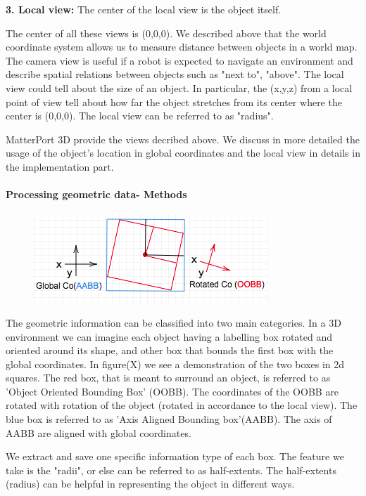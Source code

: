 \textbf{3. Local view:} The center of the local view is the object itself. 

The center of all these views is (0,0,0). We described above that the world coordinate system allows us to measure distance between objects in a world map. The camera view is useful if a robot is expected to navigate an environment and describe spatial relations between objects such as "next to", "above". The local view could tell about the size of an object. In particular, the (x,y,z) from a local point of view tell about how far the object stretches from its center where the center is (0,0,0). The local view can be referred to as "radius". 

MatterPort 3D provide the views decribed above. We discuss in more detailed the usage of the object's location in global coordinates and the local view in details in the implementation part.  

\paragraph{Processing geometric data- Methods}

\begin{figure}[H]
\includegraphics[scale=0.5]{images/A-OB.png}
\label{}
\end{figure}


The geometric information can be classified into two main categories. In a 3D environment we can imagine each object having  a labelling box rotated and oriented around its shape, and other box that bounds the first box with the global coordinates. In figure(X) we see a demonstration of the two boxes in 2d squares. The red box, that is meant to surround an object, is referred to as 'Object Oriented Bounding Box' (OOBB). The coordinates of the OOBB are rotated with rotation of the object (rotated in accordance to the local view). The blue box is referred to as 'Axis Aligned Bounding box'(AABB). The axis of AABB are aligned with global coordinates. 

We extract and save one specific information type of each box. The feature we take is the "radii", or else can be referred to as half-extents. The half-extents (radius) can be helpful in representing the object in different ways.  

